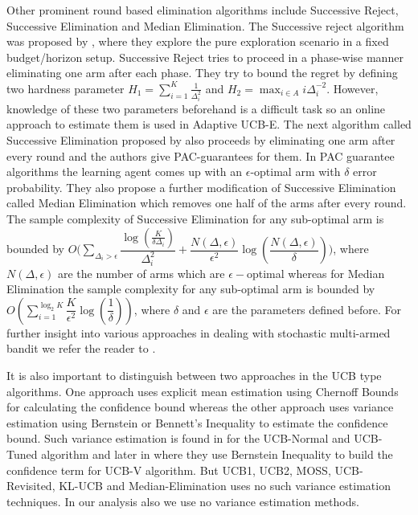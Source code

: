 	Other prominent round based elimination algorithms include Successive Reject, Successive Elimination and Median Elimination. The Successive reject algorithm was proposed by  \cite{audibert2010best}, where they explore the pure exploration scenario in a fixed budget/horizon setup. Successive Reject tries to proceed in a phase-wise manner eliminating one arm after each phase. They try to bound the regret by defining two hardness parameter $H_{1}=\sum_{i=1}^{K}\frac{1}{\Delta_{i}^{2}}$ and $H_{2}=\max_{i\in A}{i\Delta_{i}^{-2}}$. However, knowledge of these two parameters beforehand is a difficult task so an online approach to estimate them is used in Adaptive UCB-E. The next algorithm called Successive Elimination proposed by \cite{even2006action} also proceeds by eliminating one arm after every round and the authors give PAC-guarantees for them. In PAC guarantee algorithms the learning agent comes up with an $\epsilon$-optimal arm with $\delta$ error probability. They also propose a further modification of 
Successive Elimination called Median Elimination which removes one half of the arms after every round. The sample complexity of Successive Elimination for any sub-optimal arm is bounded by $O\bigg(\sum_{\Delta_{i}>\epsilon}\dfrac{\log(\frac{K}{\delta\Delta_{i}})}{\Delta_{i}^{2}}+ \dfrac{N(\Delta,\epsilon)}{\epsilon^{2}}\log(\dfrac{N(\Delta,\epsilon)}{\delta})\bigg)$, where $N(\Delta,\epsilon)$ are the number of arms which are $\epsilon-$optimal whereas for Median Elimination the sample complexity for any sub-optimal arm is bounded by $O(\sum_{i=1}^{\log_{2}K}\dfrac{K}{\epsilon^{2}}\log(\dfrac{1}{\delta}))$, where $\delta$ and $\epsilon$ are the parameters defined before.  For further insight into various approaches in dealing with stochastic multi-armed bandit we refer the reader to \cite{bubeck2012regret}.
	
	It is also important to distinguish between two approaches in the UCB type algorithms. One approach uses explicit mean estimation using Chernoff Bounds for calculating the confidence bound whereas the other approach uses variance estimation using Bernstein or Bennett's Inequality to estimate the confidence bound. Such variance estimation is found in \cite{auer2002finite} for the UCB-Normal and UCB-Tuned algorithm and later in \cite{audibert2009exploration}  where they use Bernstein Inequality to build the confidence term for UCB-V algorithm. But UCB1, UCB2, MOSS, UCB-Revisited, KL-UCB and Median-Elimination uses no such variance estimation techniques. In our analysis also we use no variance estimation methods.
	
